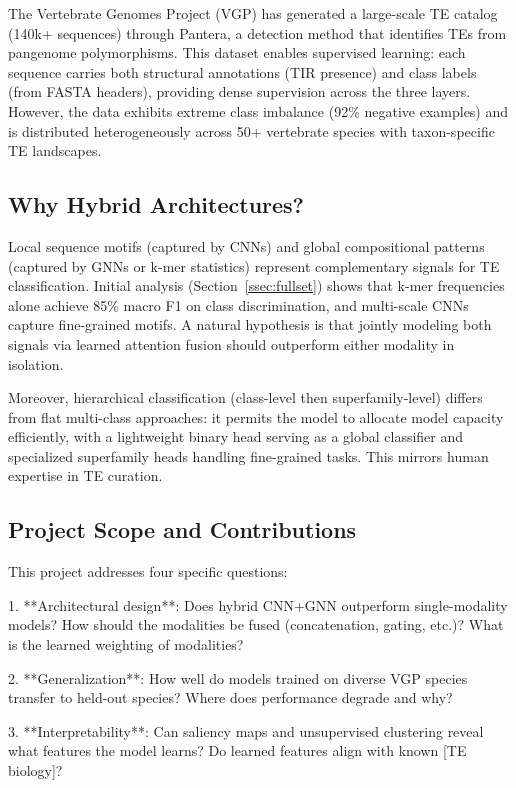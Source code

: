 \documentclass[12pt]{article}
\begin{document}
The Vertebrate Genomes Project (VGP) has generated a large-scale TE catalog (140k+ sequences) through Pantera, a detection method that identifies TEs from pangenome polymorphisms. This dataset enables supervised learning: each sequence carries both structural annotations (TIR presence) and class labels (from FASTA headers), providing dense supervision across the three layers. However, the data exhibits extreme class imbalance (92\% negative examples) and is distributed heterogeneously across 50+ vertebrate species with taxon-specific TE landscapes.

\subsection{Why Hybrid Architectures?}
Local sequence motifs (captured by CNNs) and global compositional patterns (captured by GNNs or k-mer statistics) represent complementary signals for TE classification. Initial analysis (Section~\ref{ssec:fullset}) shows that k-mer frequencies alone achieve 85\% macro F1 on class discrimination, and multi-scale CNNs capture fine-grained motifs. A natural hypothesis is that jointly modeling both signals via learned attention fusion should outperform either modality in isolation.

Moreover, hierarchical classification (class-level then superfamily-level) differs from flat multi-class approaches: it permits the model to allocate model capacity efficiently, with a lightweight binary head serving as a global classifier and specialized superfamily heads handling fine-grained tasks. This mirrors human expertise in TE curation.

\subsection{Project Scope and Contributions}

This project addresses four specific questions:

1. **Architectural design**: Does hybrid CNN+GNN outperform single-modality models? How should the modalities be fused (concatenation, gating, etc.)? What is the learned weighting of modalities?

2. **Generalization**: How well do models trained on diverse VGP species transfer to held-out species? Where does performance degrade and why?

3. **Interpretability**: Can saliency maps and unsupervised clustering reveal what features the model learns? Do learned features align with known [TE biology]?
\end{document}
